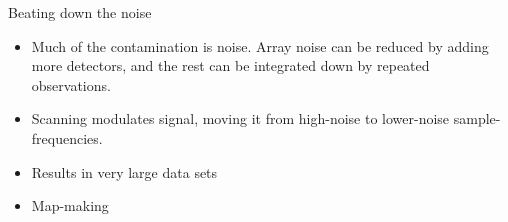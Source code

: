 \documentclass{beamer}
\begin{document}

\begin{frame}{Beating down the noise}
	\begin{itemize}
		\item Much of the contamination is noise. Array noise can be reduced by
			adding more detectors, and the rest can be integrated down by repeated
			observations.
		\item Scanning modulates signal, moving it from high-noise to lower-noise
			sample-frequencies.
		\item Results in very large data sets
		\item Map-making
	\end{itemize}
\end{frame}
\end{document}
